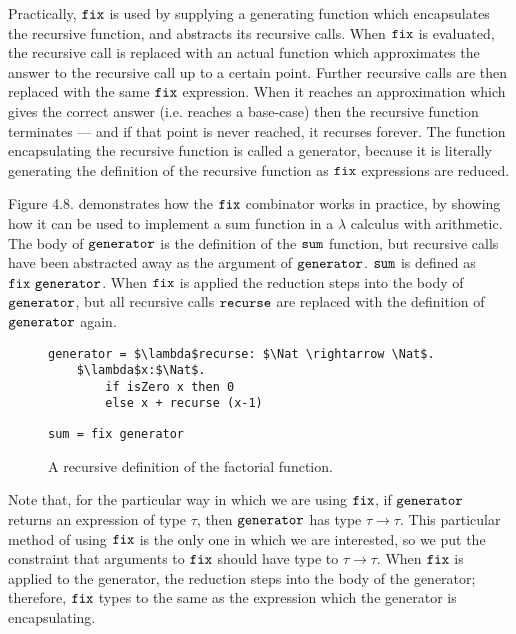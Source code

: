 Practically, $\mathtt{fix}$ is used by supplying a generating function which encapsulates the recursive function, and abstracts its recursive calls. When $\mathtt{fix}$ is evaluated, the recursive call is replaced with an actual function which approximates the answer to the recursive call up to a certain point. Further recursive calls are then replaced with the same $\mathtt{fix}$ expression. When it reaches an approximation which gives the correct answer (i.e. reaches a base-case) then the recursive function terminates --- and if that point is never reached, it recurses forever. The function encapsulating the recursive function is called a generator, because it is literally generating the definition of the recursive function as $\mathtt{fix}$ expressions are reduced.

Figure 4.8. demonstrates how the $\mathtt{fix}$ combinator works in practice, by showing how it can be used to implement a sum function in a $\lambda$ calculus with arithmetic. The body of $\mathtt{generator}$ is the definition of the $\mathtt{sum}$ function, but recursive calls have been abstracted away as the argument of $\mathtt{generator}$. $\mathtt{sum}$ is defined as $\mathtt{fix~generator}$. When $\mathtt{fix}$ is applied the reduction steps into the body of $\mathtt{generator}$, but all recursive calls $\mathtt{recurse}$ are replaced with the definition of $\mathtt{generator}$ again.

\begin{figure}[h]
\begin{lstlisting}
generator = $\lambda$recurse: $\Nat \rightarrow \Nat$.
    $\lambda$x:$\Nat$.
        if isZero x then 0
        else x + recurse (x-1)
\end{lstlisting}

\begin{lstlisting}
sum = fix generator
\end{lstlisting}

\vspace{-12pt}
\caption{A recursive definition of the factorial function.}
\label{A sample. }
\end{figure}

Note that, for the particular way in which we are using $\mathtt{fix}$, if $\mathtt{generator}$ returns an expression of type $\tau$, then $\mathtt{generator}$ has type $\tau \rightarrow \tau$. This particular method of using $\mathtt{fix}$ is the only one in which we are interested, so we put the constraint that arguments to $\mathtt{fix}$ should have type to $\tau \rightarrow \tau$. When $\mathtt{fix}$ is applied to the generator, the reduction steps into the body of the generator; therefore, $\mathtt{fix}$ types to the same as the expression which the generator is encapsulating.

